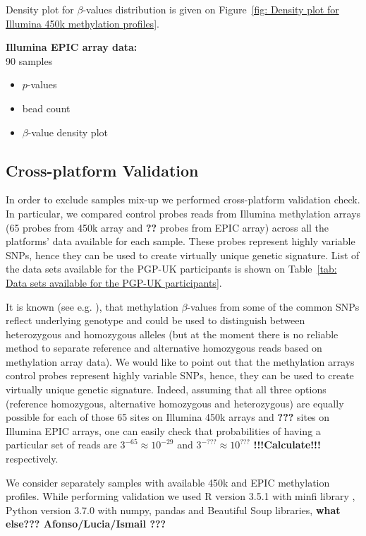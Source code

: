 \documentclass[english]{article}
\begin{document}
Density plot for $\beta$-values distribution is given on Figure~\ref{fig: Density plot for Illumina 450k methylation profiles}.

\textbf{Illumina EPIC array data:}\\
90 samples
\begin{itemize}
    \item $p$-values
    \item bead count
    \item $\beta$-value density plot 
\end{itemize}

\subsection*{Cross-platform Validation}
In order to exclude samples mix-up we performed cross-platform validation check. In particular, we compared control probes reads from Illumina methylation arrays (65 probes from 450k array and \textbf{??} probes from EPIC array) across all the platforms' data available for each sample. These probes represent highly variable SNPs, hence they can be used to create virtually unique genetic signature. List of the data sets available for the PGP-UK participants is shown on Table~\ref{tab: Data sets available for the PGP-UK participants}.

It is known (see e.g. \cite{chen2013discovery}), that methylation $\beta$-values from some of the common SNPs reflect underlying genotype and could be used to distinguish between heterozygous and homozygous alleles (but at the moment there is no reliable method to separate reference and alternative homozygous reads based on methylation array data). We would like to point out that the methylation arrays control probes represent highly variable SNPs, hence, they can be used to create virtually unique genetic signature. Indeed, assuming that all three options (reference homozygous, alternative homozygous and heterozygous) are equally possible for each of those 65 sites on Illumina 450k arrays and \textbf{???} sites on Illumina EPIC arrays, one can easily check that probabilities of having a particular set of reads are $3^{-65}\approx10^{-29}$ and $3^{-???}\approx10^{???}$ \textbf{!!!Calculate!!!} respectively.

We consider separately samples with available 450k and EPIC methylation profiles. While performing validation we used R version 3.5.1 with minfi library \cite{minfi}, Python version 3.7.0 with numpy, pandas and Beautiful Soup libraries, \textbf{what else??? Afonso/Lucia/Ismail ???}
\end{document}
